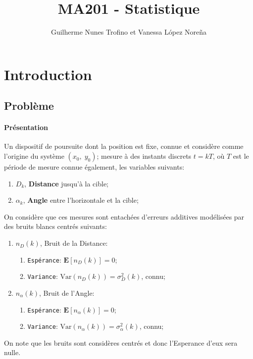 \documentclass{article}
\title{MA201 - Statistique}
\author{Guilherme Nunes Trofino et Vanessa López Noreña}
\begin{document}
\maketitle

\newpage\tableofcontents

\section*{Introduction}
\subsection*{Problème}
\paragraph{Présentation}Un dispositif de poursuite dont la position est fixe, connue et considère comme l'origine du système $(x_{0}, \; y_{0})$; mesure à des instants discrets $t = kT$, où $T$ est le période de mesure connue également, les variables suivants:
\begin{enumerate}[noitemsep]
    \item $D_{k}$, \textbf{Distance} jusqu'à la cible;
    \item $\alpha_{k}$, \textbf{Angle} entre l'horizontale et la cible;
\end{enumerate}
On considère que ces mesures sont entachées d'erreurs additives modélisées par des bruits blancs centrés \cite{bruitBlanc} suivants:
\begin{enumerate}
    \item $n_{D}(k)$, Bruit de la Distance:
    \begin{enumerate}[noitemsep]
        \item \texttt{Espérance}: $\mathbf{E}[n_{D}(k)] = 0$;
        \item \texttt{Variance}: $\text{Var}(n_{D}(k)) = \sigma_{D}^{2}(k)$, connu;
    \end{enumerate}
    \item $n_{\alpha}(k)$, Bruit de l'Angle:
        \begin{enumerate}[noitemsep]
        \item \texttt{Espérance}: $\mathbf{E}[n_{\alpha}(k)] = 0$;
        \item \texttt{Variance}: $\text{Var}(n_{\alpha}(k)) = \sigma_{\alpha}^{2}(k)$, connu;
    \end{enumerate}
\end{enumerate}
On note que les bruits sont considères centrés et donc l'Esperance d'eux sera nulle.
\end{document}
